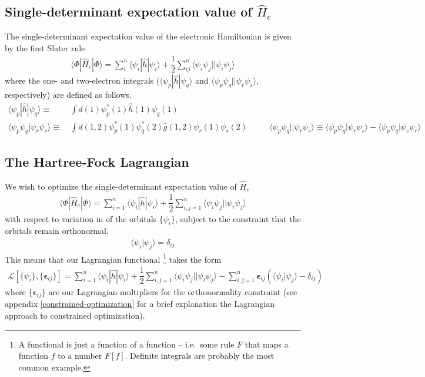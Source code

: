 \documentclass[11pt]{article}
\newcommand{\F}{\ensuremath{\Phi}}
\newcommand{\y}{\ensuremath{\psi}}
\newcommand{\eps}{\ensuremath{\bm\epsilon}}
\renewcommand{\d}{\ensuremath{\delta}}
\newcommand{\op}[1]{\ensuremath{ \hat{#1} } }
\renewcommand{\sp}{\ensuremath{\ \ \ \ \ \ }}
\newcommand{\mc}[1]{\ensuremath{\mathcal{#1}}}
\newcommand{\fr}[2]{\ensuremath{ \dfrac{#1}{#2} }}
\newcommand{\ip}[1]{\ensuremath{\langle #1\rangle}}
\theoremstyle{indented}
\begin{document}
\subsection*{Single-determinant expectation value of $\op{H}_e$}
The single-determinant expectation value of the electronic Hamiltonian is given by the first Slater rule
\begin{align}
	\ip{\F|\op{H}_e|\F}
=
\sum_{i}^n
	\ip{\y_i|\op{h}|\y_i}
+\fr{1}{2}\sum_{ij}^n
	\ip{\y_i\y_j||\y_i\y_j}
\end{align}
where the one- and two-electron integrals ($\ip{\y_p|\op{h}|\y_q}$ and $\ip{\y_p\y_q||\y_r\y_s}$, respectively) are defined as follows.
\begin{align}
\label{oei}
	\ip{\y_p|\op{h}|\y_q}
\equiv&\
\int d(1)
	\y_p^*(1)
	\op{h}(1)
	\y_q(1)
\\
\label{tei}
	\ip{\y_p\y_q|\y_r\y_s}
\equiv&\
\int d(1,2)
	\y_p^*(1)\y_q^*(2)
	\op{g}(1,2)
	\y_r(1)\y_s(2)
\sp\sp
	\ip{\y_p\y_q||\y_r\y_s}
\equiv
	\ip{\y_p\y_q|\y_r\y_s}
-
	\ip{\y_p\y_q|\y_s\y_r}
\end{align}




\subsection*{The Hartree-Fock Lagrangian}
We wish to optimize the single-determinant expectation value of $\op{H}_e$
\begin{align}
	\ip{\F|\op{H}_e|\F}
=
\sum_{i=1}^n
	\ip{\y_i|\op{h}|\y_i}
+\fr{1}{2}\sum_{i,j=1}^n
	\ip{\y_i\y_j||\y_i\y_j}
\end{align}
with respect to variation in of the orbitals $\{\y_i\}$, subject to the constraint that the orbitals remain orthonormal.
\begin{align}
	\ip{\y_i|\y_j}=\d_{ij}
\end{align}
This means that our Lagrangian functional \footnote{A functional is just a function of a function -- i.e.\ some rule $F$ that maps a function $f$ to a number $F[f]$.  Definite integrals are probably the most common example.} takes the form
\begin{align}
\label{lagrangian}
	\mc{L}[\{\y_i\},\{\eps_{ij}\}]
=
\sum_{i=1}^n
	\ip{\y_i|\op{h}|\y_i}
+\fr{1}{2}\sum_{i,j=1}^n
	\ip{\y_i\y_j||\y_i\y_j}
-\sum_{i,j=1}^n
	\eps_{ij}(\ip{\y_i|\y_j}-\d_{ij})
\end{align}
where $\{\eps_{ij}\}$ are our Lagrangian multipliers for the orthonormality constraint (see appendix \ref{constrained-optimization} for a brief explanation the Lagrangian approach to constrained optimization).
\end{document}
